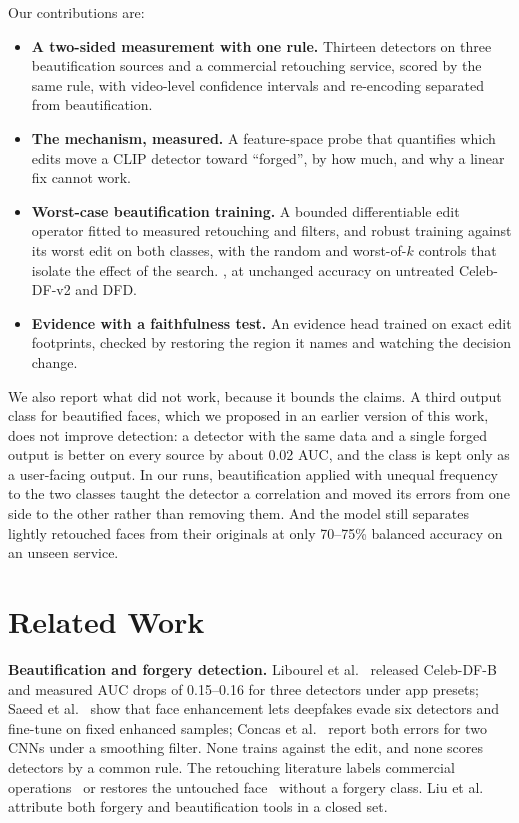 Our contributions are:
\begin{itemize}
\item \textbf{A two-sided measurement with one rule.} Thirteen detectors on three beautification sources and a commercial
retouching service, scored by the same rule, with video-level confidence intervals and re-encoding separated from
beautification.
\item \textbf{The mechanism, measured.} A feature-space probe that quantifies which edits move a CLIP detector toward
``forged'', by how much, and why a linear fix cannot work.
\item \textbf{Worst-case beautification training.} A bounded differentiable edit operator fitted to measured retouching and
filters, and robust training against its worst edit on both classes, with the random and worst-of-$k$ controls that
isolate the effect of the search. , at unchanged accuracy on untreated Celeb-DF-v2 and DFD.
\item \textbf{Evidence with a faithfulness test.} An evidence head trained on exact edit footprints, checked by restoring
the region it names and watching the decision change.
\end{itemize}
We also report what did not work, because it bounds the claims. A third output class for beautified faces, which we
proposed in an earlier version of this work, does not improve detection: a detector with the same data and a single forged
output is better on every source by about 0.02 AUC, and the class is kept only as a user-facing output. In our runs, beautification
applied with unequal frequency to the two classes taught the detector a correlation and moved its errors from one side to
the other rather than removing them. And the model still separates lightly retouched faces from their originals at only
70--75\% balanced accuracy on an unseen service.

\section{Related Work}
\textbf{Beautification and forgery detection.} Libourel et al.~\cite{libourel2024} released Celeb-DF-B and measured AUC
drops of 0.15--0.16 for three detectors under app presets; Saeed et al.~\cite{saeed2025} show that face enhancement lets
deepfakes evade six detectors and fine-tune on fixed enhanced samples; Concas et al.~\cite{concas2025} report both errors
for two CNNs under a smoothing filter. None trains against the edit, and none scores detectors by a common rule. The
retouching literature labels commercial operations~\cite{retouchingffhq} or restores the untouched face~\cite{frrffusion,mofrr,reface,wang2019photoshop}
without a forgery class. Liu et al.~\cite{miea2026} attribute both forgery and beautification tools in a closed set.


